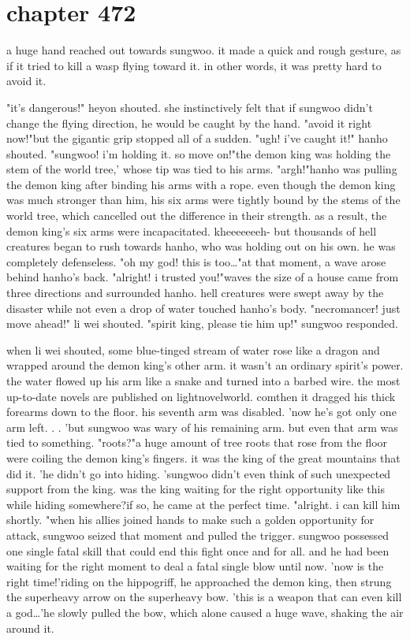 \section{chapter 472}

a huge hand reached out towards sungwoo.
 it made a quick and rough gesture, as if it tried to kill a wasp flying toward it.
 in other words, it was pretty hard to avoid it.





"it's dangerous!" heyon shouted.
she instinctively felt that if sungwoo didn't change the flying direction, he would be caught by the hand.
"avoid it right now!"but the gigantic grip stopped all of a sudden.
"ugh! i've caught it!" hanho shouted.
 "sungwoo! i'm holding it.
 so move on!"the demon king was holding the stem of the world tree,' whose tip was tied to his arms.
 "argh!"hanho was pulling the demon king after binding his arms with a rope.
 even though the demon king was much stronger than him, his six arms were tightly bound by the stems of the world tree, which cancelled out the difference in their strength.
 as a result, the demon king's six arms were incapacitated.
kheeeeeeeh- but thousands of hell creatures began to rush towards hanho, who was holding out on his own.
 he was completely defenseless.
"oh my god! this is too…"at that moment, a wave arose behind hanho's back.
"alright! i trusted you!"waves the size of a house came from three directions and surrounded hanho.
hell creatures were swept away by the disaster while not even a drop of water touched hanho's body.
"necromancer! just move ahead!" li wei shouted.
 "spirit king, please tie him up!" sungwoo responded.
 
when li wei shouted, some blue-tinged stream of water rose like a dragon and wrapped around the demon king's other arm.
 it wasn't an ordinary spirit's power.
the water flowed up his arm like a snake and turned into a barbed wire.
 the most up-to-date novels are published on lightnovelworld.
comthen it dragged his thick forearms down to the floor.
 his seventh arm was disabled.
 'now he's got only one arm left.
.
.
'but sungwoo was wary of his remaining arm.
 but even that arm was tied to something.
"roots?"a huge amount of tree roots that rose from the floor were coiling the demon king's fingers.
 it was the king of the great mountains that did it.
 'he didn't go into hiding.
'sungwoo didn't even think of such unexpected support from the king.
 was the king waiting for the right opportunity like this while hiding somewhere?if so, he came at the perfect time.
"alright.
 i can kill him shortly.
"when his allies joined hands to make such a golden opportunity for attack, sungwoo seized that moment and pulled the trigger.
 sungwoo possessed one single fatal skill that could end this fight once and for all.
 and he had been waiting for the right moment to deal a fatal single blow until now.
'now is the right time!'riding on the hippogriff, he approached the demon king, then strung the superheavy arrow on the superheavy bow.
'this is a weapon that can even kill a god…'he slowly pulled the bow, which alone caused a huge wave, shaking the air around it.
 
